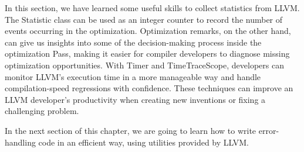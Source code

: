 In this section, we have learned some useful skills to collect statistics from LLVM. The Statistic class can be used as an integer counter to record the number of events occurring in the optimization. Optimization remarks, on the other hand, can give us insights into some of the decision-making process inside the optimization Pass, making it easier for compiler developers to diagnose missing optimization  opportunities. With Timer and TimeTraceScope, developers can monitor LLVM's execution time in a more manageable way and handle compilation-speed regressions with confidence. These techniques can improve an LLVM developer's productivity when creating new inventions or fixing a challenging problem.

In the next section of this chapter, we are going to learn how to write error-handling code in an efficient way, using utilities provided by LLVM.





